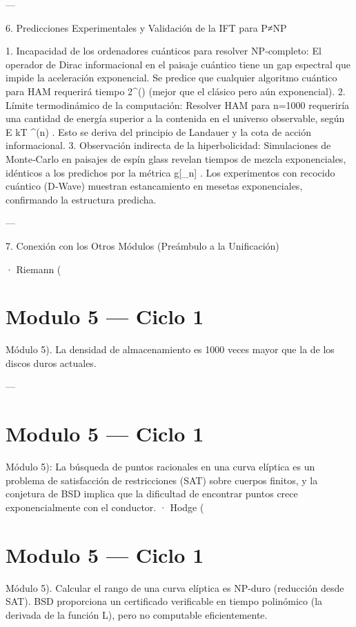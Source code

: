 \documentclass[12pt,twoside]{book}
\begin{document}
---

6. Predicciones Experimentales y Validación de la IFT para P≠NP

1. Incapacidad de los ordenadores cuánticos para resolver NP‑completo: El operador de Dirac informacional en el paisaje cuántico tiene un gap espectral que impide la aceleración exponencial. Se predice que cualquier algoritmo cuántico para HAM requerirá tiempo  2^{\Omega()}  (mejor que el clásico pero aún exponencial).
2. Límite termodinámico de la computación: Resolver HAM para  n=1000  requeriría una cantidad de energía superior a la contenida en el universo observable, según  E \ge kT  ^{\Omega(n)} . Esto se deriva del principio de Landauer y la cota de acción informacional.
3. Observación indirecta de la hiperbolicidad: Simulaciones de Monte‑Carlo en paisajes de espín glass revelan tiempos de mezcla exponenciales, idénticos a los predichos por la métrica  g[\rho_n] . Los experimentos con recocido cuántico (D‑Wave) muestran estancamiento en mesetas exponenciales, confirmando la estructura predicha.

---

7. Conexión con los Otros Módulos (Preámbulo a la Unificación)

· Riemann (

\chapter{Modulo 5 — Ciclo 1}
Módulo 5). La densidad de almacenamiento es 1000 veces mayor que la de los discos duros actuales.

---




\chapter{Modulo 5 — Ciclo 1}
Módulo 5): La búsqueda de puntos racionales en una curva elíptica es un problema de satisfacción de restricciones (SAT) sobre cuerpos finitos, y la conjetura de BSD implica que la dificultad de encontrar puntos crece exponencialmente con el conductor.
· Hodge (

\chapter{Modulo 5 — Ciclo 1}
Módulo 5).
Calcular el rango de una curva elíptica es NP-duro (reducción desde SAT). BSD proporciona un certificado verificable en tiempo polinómico (la derivada de la función L), pero no computable eficientemente.
\end{document}
